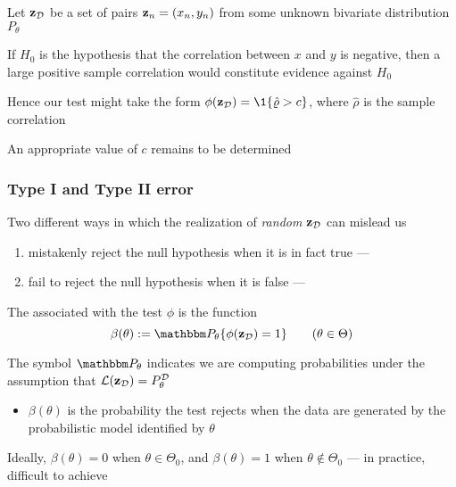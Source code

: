 \begin{frame}

    \vspace{2em}
    \Eg
    Let $\mathbf{z}_{\mathcal D}$ be a set of pairs ${\mathbf z}_n = (x_n, y_n)$ from some unknown
    bivariate distribution $P_{\theta}$
    
    If $H_0$ is the hypothesis that the
    correlation between $x$ and $y$ is negative, then 
    a large positive sample correlation would constitute evidence against $H_0$
    
    Hence our test might take the form $\phi(\zdata) = \1\{\hat \rho >
    c\}$, where $\hat \rho$ is the sample correlation
    
    An appropriate value
    of $c$ remains to be determined 
    
    
\end{frame}

\begin{frame}\frametitle{Type I and Type II error}

    \vspace{2em}
    Two different ways in
    which the realization of \emph{random} $\mathbf{z}_{\mathcal D}$ can mislead us
    
    \begin{enumerate}
        \item mistakenly reject the null
    hypothesis when it is in fact true ---  
        \item fail to reject the null hypothesis when it is false --- 
    \end{enumerate}
    
\end{frame}

\begin{frame}

    \vspace{2em}
    The  associated with the test $\phi$ is the function
    \begin{equation*}
        \beta(\theta) := \PP_{\theta} \{\phi(\zdata) = 1\}
        \qquad (\theta \in \Theta)
    \end{equation*}
    
    \vspace{.7em}
    The symbol $\PP_{\theta}$ indicates we are computing
    probabilities under the assumption that $\mathcal L(\mathbf{z}_{\mathcal D}) =
    P^{\mathcal D}_{\theta}$
    \begin{itemize}
        \item $\beta(\theta)$ is the probability the test 
        rejects when the data are generated by the 
        probabilistic model identified by $\theta$
    \end{itemize}
    
    \vspace{.7em}
    Ideally, $\beta(\theta) = 0$ when $\theta \in \Theta_0$, and
    $\beta(\theta) = 1$ when $\theta \notin \Theta_0$ --- in practice,
    difficult to achieve

\end{frame}

